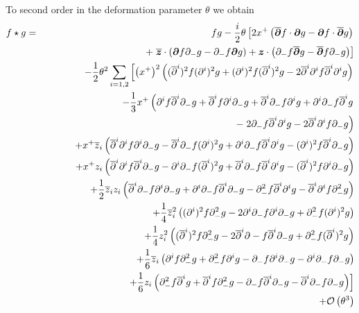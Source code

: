 To second order in the deformation parameter $\theta$ we obtain
\begin{eqnarray}
  \label{eq:weyl:positionspace}
  f\star g&=&f g- \frac{ i}2  \theta \left[
  2x^+ \left( \overline{{{\boldsymbol {\partial} }}}f\cdot{{\boldsymbol {\partial} }} g
  - {{\boldsymbol {\partial} }} f\cdot\overline{{{\boldsymbol {\partial} }}}g\right)\right.\\\nonumber
  &&\qquad\qquad\qquad+\left.\overline{{{\boldsymbol {z} }}}\cdot\left({{\boldsymbol {\partial} }} f \partial_- g
  - \partial_- f {{\boldsymbol {\partial} }} g\right)+ {{\boldsymbol {z} }}\cdot\left(\partial_- f \overline{{{\boldsymbol {\partial} }}}g
   - \overline{{{\boldsymbol {\partial} }}}f \partial_- g\right)\right]\\ \nonumber
  &&-  \frac1{2}  \theta^2  \sum\limits_{i=1,2}  \left[
  \left(x^+\right)^2 
  \left(( \overline{\partial}^{ i})^2f (\partial^i)^2g
  +(\partial^i)^2f ( \overline{\partial}^{ i})^2g
  -2\overline{\partial}^{ i}\partial^if \overline{\partial}^{ i}\partial^ig
  \right)\right.\\ \nonumber &&\qquad\quad
  -  \frac13  x^+ \left(\partial^if \overline{\partial}^{ i}\partial_- g
  +\overline{\partial}^{ i}f \partial^i\partial_- g
  +\overline{\partial}^{ i}\partial_- f \partial^ig
  +\partial^i\partial_- f \overline{\partial}^{ i}g\right.\\ \nonumber
  &&\qquad\qquad\qquad\qquad\quad
  -\left.2\partial_-f \overline{\partial}^{ i}
  \partial^ig-2\overline{\partial}^{ i}\partial^if 
  \partial_-g\right)\\\nonumber&&\qquad\quad
  + x^+ \overline{z}_i \left( \overline{\partial}^{ i}
  \partial^if \partial^i\partial_- g
  -\overline{\partial}^{ i}\partial_- f (\partial^i)^2g
  +\partial^i\partial_- f \overline{\partial}^{ i}\partial^ig
  -(\partial^i)^2f \overline{\partial}^{ i}\partial_- g\right)
  \\ \nonumber &&\qquad\quad
  + x^+ z_i \left( \overline{\partial}^{ i}\partial^if \overline{\partial}^{ i}\partial_- g
  -\partial^i\partial_- f ( \overline{\partial}^{ i})^2g
  +\overline{\partial}^{ i}\partial_- f \overline{\partial}^{ i}\partial^ig
  -( \overline{\partial}^{ i})^2f \partial^i\partial_- g\right)\\ \nonumber
  &&\qquad\quad
  +  \frac12  \overline{z}_i z_i \left( 
  \overline{\partial}^{ i}\partial_- f \partial^i\partial_- g
  +\partial^i\partial_- f \overline{\partial}^{ i}\partial_- g
  -\partial_- ^2f \overline{\partial}^{ i}\partial^ig
  -\overline{\partial}^{ i}\partial^if \partial_-^2g\right)
  \\ \nonumber &&\qquad\quad
  +  \frac14  \overline{z}_i^{ 2} 
  \left((\partial^i)^2f \partial_-^2g
  -2\partial^i\partial_- f \partial^i\partial_- g
  +\partial_-^2f (\partial^i)^2g\right)\\ \nonumber &&\qquad\quad
  +  \frac14  z_i^2 
  \left(( \overline{\partial}^{ i})^2f \partial_-^2g
  -2\overline{\partial}^{ i}\partial- f \overline{\partial}^{ i}\partial_- g
  +\partial_-^2f ( \overline{\partial}^{ i})^2g\right)
  \\ \nonumber &&\qquad\quad
  +  \frac16  \overline{z}_i \left(\partial^if \partial_-^2g
  +\partial_-^2f \partial^ig-\partial_-f \partial^i
  \partial_-g-\partial^i\partial_-f \partial_-g\right)
  \\&&\qquad\quad
  +\Bigl. \frac16  z_i \left(\partial_-^2f \overline{\partial}^{ i}g
  +\overline{\partial}^{ i}f \partial_-^2g-\partial_-f \overline{\partial}^{ i}\partial_-g-
  \overline{\partial}^{ i}\partial_-f \partial_-g\right)
\Bigr]\\\nonumber
&&+{\mathcal O}\left(\theta^3\right)
\end{eqnarray}

